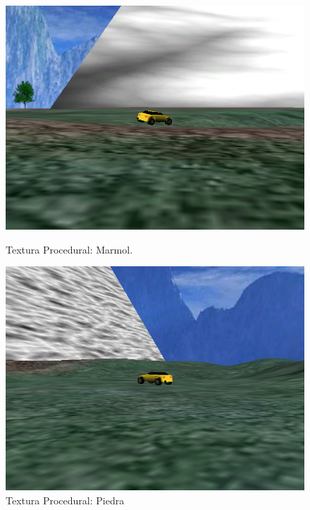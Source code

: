 \documentclass[a4paper,11pt]{article}
\begin{document}
\begin{figure}
\begin{minipage}[b]{0.5\linewidth}
\centering
 \includegraphics[scale=0.250]{./marble.png}
 \caption{Textura Procedural: Marmol.}
\label{fig:figure5}
\end{minipage}
\hspace{0.5cm}
\begin{minipage}[b]{0.5\linewidth}
\centering
 \includegraphics[scale=0.250]{./stone.png}
 \caption{Textura Procedural: Piedra}
\label{fig:figure6}
\end{minipage}
\end{figure}
\end{document}
